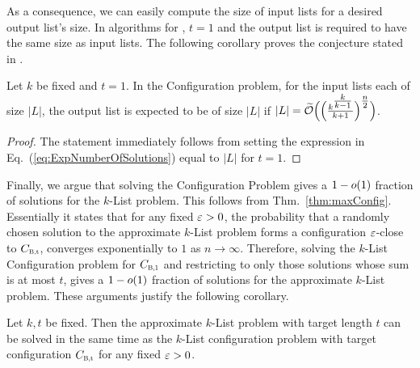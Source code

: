 As a consequence, we can easily compute the size of input lists for a desired output list's size. In algorithms for \SVP, $t=1$ and the output list is required to have the same size as input lists. The following corollary proves the conjecture stated in \cite{BLS16}.

\begin{corollary} \label{cor:BalancedListSizes}
Let $k$ be fixed and $t=1$. In the Configuration problem, for the input lists each of size $|L|$, the output list is expected to be of size $|L|$ if $|L|  = \widetilde{\mathcal{O}} \Bigl( \Bigl( \frac{k^{\tfrac{k}{k-1}}}{k+1} \Bigr)^{\tfrac{n}{2}} \Bigr)$. 
\end{corollary}
\begin{proof}
	The statement immediately follows from setting the expression in Eq.~(\ref{eq:ExpNumberOfSolutions}) equal to $|L|$ for $t=1$. 
\end{proof}

Finally, we argue that solving the Configuration Problem gives a $1-o(1)$ fraction of solutions for the $k$-List problem. This follows from Thm.~\ref{thm:maxConfig}. Essentially it states that for any fixed $\varepsilon>0$, the probability that a randomly chosen solution to the approximate $k$-List problem forms a configuration $\varepsilon$-close to $\Cbalt$, converges exponentially to $1$ as $n \rightarrow \infty$. Therefore, solving the $k$-List Configuration problem for $\CbalOne$ and restricting to only those solutions whose sum is at most $t$, gives a $1-o(1)$ fraction of solutions for the approximate $k$-List problem. These arguments justify the following corollary.

\begin{corollary}\label{cor:ReductionToConfigProblem}
Let $k,t$ be fixed. Then the approximate $k$-List problem with target length $t$ can be solved in the same time as the $k$-List configuration problem with target configuration $\Cbalt$ for any fixed $\varepsilon>0$.
\end{corollary}
